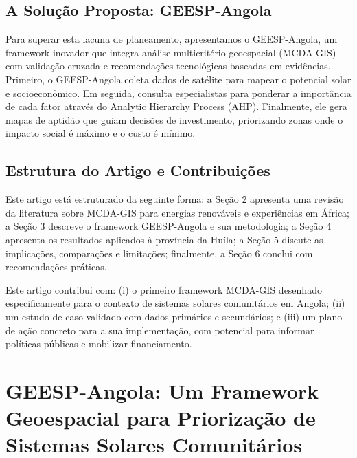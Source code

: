 \documentclass[12pt, a4paper]{article}
\begin{document}
\subsection{A Solução Proposta: GEESP-Angola}
Para superar esta lacuna de planeamento, apresentamos o GEESP-Angola, um framework inovador que integra análise multicritério geoespacial (MCDA-GIS) com validação cruzada e recomendações tecnológicas baseadas em evidências. Primeiro, o GEESP-Angola coleta dados de satélite para mapear o potencial solar e socioeconômico. Em seguida, consulta especialistas para ponderar a importância de cada fator através do Analytic Hierarchy Process (AHP). Finalmente, ele gera mapas de aptidão que guiam decisões de investimento, priorizando zonas onde o impacto social é máximo e o custo é mínimo.

\subsection{Estrutura do Artigo e Contribuições}
Este artigo está estruturado da seguinte forma: a Seção 2 apresenta uma revisão da literatura sobre MCDA-GIS para energias renováveis e experiências em África; a Seção 3 descreve o framework GEESP-Angola e sua metodologia; a Seção 4 apresenta os resultados aplicados à província da Huíla; a Seção 5 discute as implicações, comparações e limitações; finalmente, a Seção 6 conclui com recomendações práticas.

Este artigo contribui com: (i) o primeiro framework MCDA-GIS desenhado especificamente para o contexto de sistemas solares comunitários em Angola; (ii) um estudo de caso validado com dados primários e secundários; e (iii) um plano de ação concreto para a sua implementação, com potencial para informar políticas públicas e mobilizar financiamento.

\section{GEESP-Angola: Um Framework Geoespacial para Priorização de Sistemas Solares Comunitários}
\end{document}
